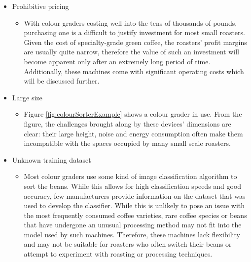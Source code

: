 \begin{itemize}
	\item Prohibitive pricing
		\begin{itemize}
			\item With colour graders costing well into the tens of thousands of pounds,
				purchasing one is a difficult to justify investment for most small
				roasters.
				Given the cost of specialty-grade green coffee, the roasters' profit
				margins are usually quite narrow, therefore the value of such an
				investment will become apparent only after an extremely long period of
				time.
				Additionally, these machines come with significant operating costs
				which will be discussed further.
		\end{itemize}

	\item Large size
		\begin{itemize}
			\item Figure \ref{fig:colourSorterExample} shows a colour grader in use.
				From the figure, the challenges brought along by these devices'
				dimensions are clear: their large height, noise and energy consumption
				often make them incompatible with the spaces occupied by many small
				scale roasters.
		\end{itemize}

	\item Unknown training dataset
		\begin{itemize}
			\item Most colour graders use some kind of image classification algorithm to
				sort the beans.
				While this allows for high classification speeds and
				good accuracy, few manufacturers provide information on the dataset that
				was used to develop the classifier.
				While this is unlikely to pose an
				issue with the most frequently consumed coffee varieties, rare coffee species
				or beans that have undergone an unusual processing method may not fit into
				the model used by such machines.
				Therefore, these machines lack flexibility
				and may not be suitable for roasters who often switch their beans or attempt
				to experiment with roasting or processing techniques.
		\end{itemize}


\end{itemize}
